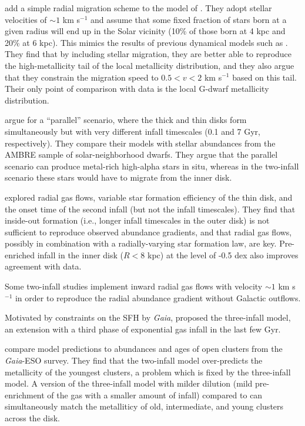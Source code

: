 \documentclass[twocolumn,twocolappendix,linenumbers]{aastex631}
\begin{document}
\citet{spitoni_effect_2015} add a simple radial migration scheme to the model of \citet{spitoni_effects_2011}. They adopt stellar velocities of $\sim 1$ km s$^{-1}$ and assume that some fixed fraction of stars born at a given radius will end up in the Solar vicinity (10\% of those born at 4 kpc and 20\% at 6 kpc). This mimics the results of previous dynamical models such as \citet{minchev_chemodynamical_2013}. They find that by including stellar migration, they are better able to reproduce the high-metallicity tail of the local metallicity distribution, and they also argue that they constrain the migration speed to $0.5 < v < 2$ km s$^{-1}$ based on this tail. Their only point of comparison with data is the local G-dwarf metallicity distribution.

\citet{grisoni_ambre_2017} argue for a ``parallel'' scenario, where the thick and thin disks form simultaneously but with very different infall timescales (0.1 and 7 Gyr, respectively). They compare their models with stellar abundances from the AMBRE sample of solar-neighborhood dwarfs. They argue that the parallel scenario can produce metal-rich high-alpha stars in situ, whereas in the two-infall scenario these stars would have to migrate from the inner disk.

\citet{palla_chemical_2020} explored radial gas flows, variable star formation efficiency of the thin disk, and the onset time of the second infall (but not the infall timescales). They find that inside-out formation (i.e., longer infall timescales in the outer disk) is not sufficient to reproduce observed abundance gradients, and that radial gas flows, possibly in combination with a radially-varying star formation law, are key. Pre-enriched infall in the inner disk ($R<8$ kpc) at the level of -0.5 dex also improves agreement with data.

Some two-infall studies \citep[e.g.,][]{spitoni_effects_2011,palla_chemical_2020,palla_mapping_2024} implement inward radial gas flows with velocity $\sim1$ km s$^{-1}$ in order to reproduce the radial abundance gradient without Galactic outflows.

Motivated by constraints on the SFH by {\it Gaia}, \citet{spitoni_beyond_2023} proposed the three-infall model, an extension with a third phase of exponential gas infall in the last few Gyr.

\citet{palla_mapping_2024} compare model predictions to abundances and ages of open clusters from the {\it Gaia}-ESO survey. They find that the two-infall model over-predicts the metallicity of the youngest clusters, a problem which is fixed by the three-infall model. A version of the three-infall model with milder dilution (mild pre-enrichment of the gas with a smaller amount of infall) compared to \citet{spitoni_beyond_2023} can simultaneously match the metalliticy of old, intermediate, and young clusters across the disk.
\end{document}
